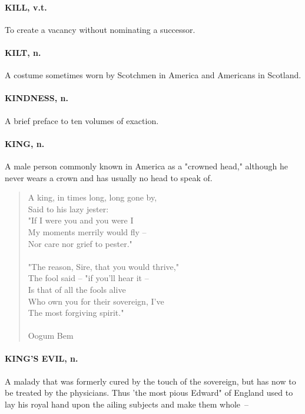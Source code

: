 \documentclass[11pt]{article}
\begin{document}
\paragraph{KILL, v.t.}  To create a vacancy without nominating a successor.

\paragraph{KILT, n.}  A costume sometimes worn by Scotchmen in America and
Americans in Scotland.

\paragraph{KINDNESS, n.}  A brief preface to ten volumes of exaction.

\paragraph{KING, n.}  A male person commonly known in America as a "crowned head,"
although he never wears a crown and has usually no head to speak of.

\begin{quote}   A king, in times long, long gone by, \\
      Said to his lazy jester: \\
  "If I were you and you were I \\
  My moments merrily would fly -- \\
      Nor care nor grief to pester." \\
 \\
  "The reason, Sire, that you would thrive," \\
      The fool said -- "if you'll hear it -- \\
  Is that of all the fools alive \\
  Who own you for their sovereign, I've \\
      The most forgiving spirit." \\
 \\
Oogum Bem \end{quote}


\paragraph{KING'S EVIL, n.}  A malady that was formerly cured by the touch of the
sovereign, but has now to be treated by the physicians.  Thus 'the
most pious Edward" of England used to lay his royal hand upon the
ailing subjects and make them whole~--
\end{document}
